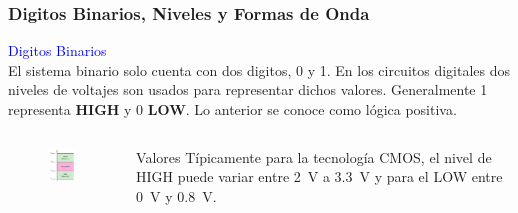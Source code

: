 \documentclass[10.5pt,scale=1.0,t,aspectratio=169,hyperref={pdfpagelabels=false}]{beamer}
\begin{document}
\begin{frame}
	\frametitle{Digitos Binarios, Niveles y Formas de Onda}
	\justifying
\textcolor{blue}{\large Digitos Binarios} \\
El sistema binario solo cuenta con dos digitos, 0 y 1. En los circuitos digitales dos niveles de voltajes son usados para representar dichos valores. Generalmente 1 representa \textbf{HIGH} y 0 \textbf{LOW}. Lo anterior se conoce como lógica positiva.
\vspace{-0.2in}
\begin{columns}
	\begin{block}
		\justifying
		\vspace{-0.3in}
		\begin{figure}
			\centering
			\includegraphics[width=4cm]{RangosNivelesVoltaje}
		\end{figure}
	\end{block}
	
	\column{0.5\linewidth}
	\begin{block}{\small Valores}
		\justifying
		Típicamente para la tecnología CMOS, el nivel de HIGH puede variar entre \SI{2}{\volt} a \SI{3.3}{\volt} y para el LOW entre \SI{0}{\volt} y \SI{0.8}{\volt}.
	\end{block}
\end{columns}	
\end{frame}
\end{document}
